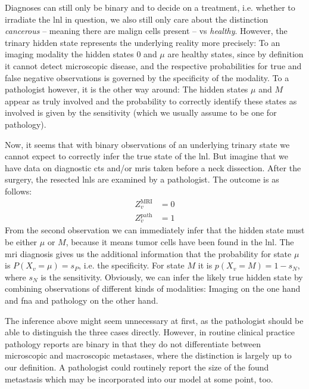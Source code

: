 \documentclass[\relativeRoot/main.tex]{subfiles}
\begin{document}
Diagnoses can still only be binary and to decide on a treatment, i.e. whether to irradiate the \gls{lnl} in question, we also still only care about the distinction \emph{cancerous} -- meaning there are malign cells present -- vs \emph{healthy}. However, the trinary hidden state represents the underlying reality more precisely: To an imaging modality the hidden states $0$ and $\mu$ are healthy states, since by definition it cannot detect microscopic disease, and the respective probabilities for true and false negative observations is governed by the specificity of the modality. To a pathologist however, it is the other way around: The hidden states $\mu$ and $M$ appear as truly involved and the probability to correctly identify these states as involved is given by the sensitivity (which we usually assume to be one for pathology).

Now, it seems that with binary observations of an underlying trinary state we cannot expect to correctly infer the true state of the \gls{lnl}. But imagine that we have data on diagnostic \glspl{ct} and/or \glspl{mri} taken before a neck dissection. After the surgery, the resected \glspl{lnl} are examined by a pathologist. The outcome is as follows:
%
\begin{equation}
    \begin{aligned}
        Z_v^\text{MRI} &= 0 \\
        Z_v^\text{path} &= 1
    \end{aligned}
\end{equation}
%
From the second observation we can immediately infer that the hidden state must be either $\mu$ or $M$, because it means tumor cells have been found in the \gls{lnl}. The \gls{mri} diagnosis gives us the additional information that the probability for state $\mu$ is $P(X_v = \mu) = s_P$, i.e. the specificity. For state $M$ it is $p(X_v = M) = 1 - s_N$, where $s_N$ is the sensitivity. Obviously, we can infer the likely true hidden state by combining observations of different kinds of modalities: Imaging on the one hand and \gls{fna} and pathology on the other hand.

The inference above might seem unnecessary at first, as the pathologist should be able to distinguish the three cases directly. However, in routine clinical practice pathology reports are binary in that they do not differentiate between microscopic and macroscopic metastases, where the distinction is largely up to our definition. A pathologist could routinely report the size of the found metastasis which may be incorporated into our model at some point, too.
\end{document}
